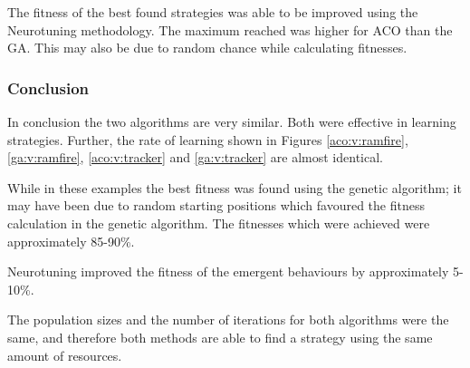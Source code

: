 The fitness of the best found strategies was able to be improved using the Neurotuning methodology. The maximum reached was higher for ACO than the GA. This may also be due to random chance while calculating fitnesses.

\FigStrategyTune

\subsubsection{Conclusion}
In conclusion the two algorithms are very similar. Both were effective in learning strategies. Further, the rate of learning shown in Figures \ref{aco:v:ramfire}, \ref{ga:v:ramfire}, \ref{aco:v:tracker} and \ref{ga:v:tracker} are almost identical.

While in these examples the best fitness was found using the genetic algorithm; it may have been due to random starting positions which favoured the fitness calculation in the genetic algorithm. The fitnesses which were achieved were approximately 85-90\%.

Neurotuning improved the fitness of the emergent behaviours by approximately 5-10\%.

The population sizes and the number of iterations for both algorithms were the same, and therefore both methods are able to find a strategy using the same amount of resources.
